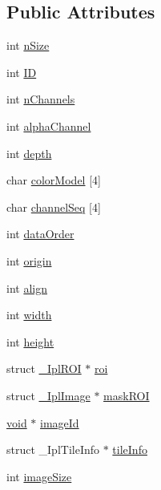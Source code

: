 \subsection*{Public Attributes}
\begin{DoxyCompactItemize}
\item 
int \hyperlink{struct__IplImage_ac042e3a06cc422bccb1a1f8152f24a49}{n\-Size}
\item 
int \hyperlink{struct__IplImage_a995c41842868b0370ca485929bb71606}{I\-D}
\item 
int \hyperlink{struct__IplImage_a5d933a635592532b912e0427b1b606b2}{n\-Channels}
\item 
int \hyperlink{struct__IplImage_a7d8aece5d2f9236fb1e712ef76f7ceb8}{alpha\-Channel}
\item 
int \hyperlink{struct__IplImage_ad4326e3cb33d92d5f30621789b23c67c}{depth}
\item 
char \hyperlink{struct__IplImage_abb1da44708efff7421fc569502be3df3}{color\-Model} \mbox{[}4\mbox{]}
\item 
char \hyperlink{struct__IplImage_ae054c335a4bce0132b6a85f4b428a02b}{channel\-Seq} \mbox{[}4\mbox{]}
\item 
int \hyperlink{struct__IplImage_a0569ad4452436f5b651e8a8c9e15cc3a}{data\-Order}
\item 
int \hyperlink{struct__IplImage_ac391fa66e6f3075d78f17e30ef3136e5}{origin}
\item 
int \hyperlink{struct__IplImage_a8c6319575da9a150894eed1354578163}{align}
\item 
int \hyperlink{struct__IplImage_af6e81897beca2d2d9914949912cd7b32}{width}
\item 
int \hyperlink{struct__IplImage_a760ffed837a60c6606047177697d97f3}{height}
\item 
struct \hyperlink{struct__IplROI}{\-\_\-\-Ipl\-R\-O\-I} $\ast$ \hyperlink{struct__IplImage_a697184a2da29652d664ae540ec36839b}{roi}
\item 
struct \hyperlink{struct__IplImage}{\-\_\-\-Ipl\-Image} $\ast$ \hyperlink{struct__IplImage_a54d4dfa9db712c250c54bbdb1eb50235}{mask\-R\-O\-I}
\item 
\hyperlink{legacy_8hpp_a8bb47f092d473522721002c86c13b94e}{void} $\ast$ \hyperlink{struct__IplImage_abf166d6ba198582e05f72e2ebaeae67a}{image\-Id}
\item 
struct \-\_\-\-Ipl\-Tile\-Info $\ast$ \hyperlink{struct__IplImage_a3901b044f1243c6f50ff24f68b599796}{tile\-Info}
\item 
int \hyperlink{struct__IplImage_a952f4afaf1b3f68d004a806e5b535bde}{image\-Size}

\end{DoxyCompactItemize}
